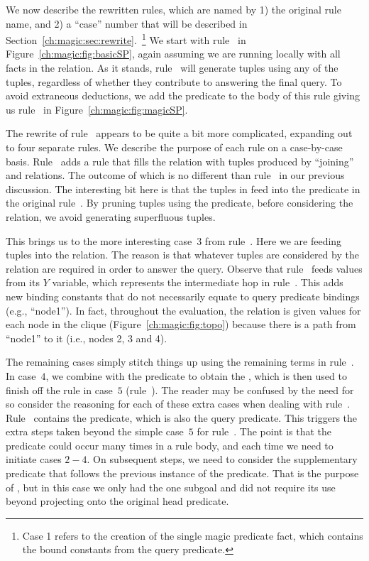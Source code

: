 We now describe the rewritten rules, which are named by 1) the original rule
name, and 2) a ``case'' number that will be described in
Section~\ref{ch:magic:sec:rewrite}.~\footnote{Case 1 refers to the creation of
the single magic predicate  fact, which contains the bound
constants from the query predicate.} We start with rule~ in
Figure~\ref{ch:magic:fig:basicSP}, again assuming we are running locally with
all facts in the  relation.  As it stands, rule~ will generate
 tuples using any of the  tuples, regardless of whether they
contribute to answering the final query.  To avoid extraneous deductions, we
add the  predicate to the body of this rule giving us
rule~ in Figure~\ref{ch:magic:fig:magicSP}.

The rewrite of rule~ appears to be quite a bit more complicated,
expanding out to four separate rules.  We describe the purpose of each rule on
a case-by-case basis.  Rule~ adds a rule that fills the
 relation with tuples produced by ``joining'' 
and  relations.  The outcome of which is no different than
rule~ in our previous discussion.  The interesting bit here is
that the tuples in  feed into the  predicate in the
original rule~.  By pruning tuples using the  predicate,
before considering the  relation, we avoid generating superfluous
tuples.

This brings us to the more interesting case~$3$ from rule~.  Here we are
feeding  tuples into the  relation.  The reason
is that whatever tuples are considered by the  relation are required
in order to answer the query.  Observe that rule~ feeds
 values from its $Y$ variable, which represents the
intermediate hop in rule~.  This adds new binding constants that do not
necessarily equate to query predicate bindings (e.g., ``node1'').  In fact,
throughout the evaluation, the  relation is given values for
each node in the clique (Figure~\ref{ch:magic:fig:topo}) because there is a
path from ``node1'' to it (i.e., nodes 2, 3 and 4).

The remaining cases simply stitch things up using the remaining terms in
rule~.  In case~$4$, we combine  with the 
predicate to obtain the , which is then used to finish off the
rule in case~$5$ (rule~).  The reader may be confused by the need
for  so consider the reasoning for each of these extra cases
when dealing with rule~.  Rule~ contains the  predicate,
which is also the query predicate.  This triggers the extra steps taken beyond
the simple case~$5$ for rule~.  The point is that the 
predicate could occur many times in a rule body, and each time we need to
initiate cases $2-4$.  On subsequent steps, we need to consider the
supplementary predicate that follows the previous instance of the 
predicate.  That is the purpose of , but in this case we only
had the one  subgoal and did not require its use beyond projecting
onto the original head predicate.

